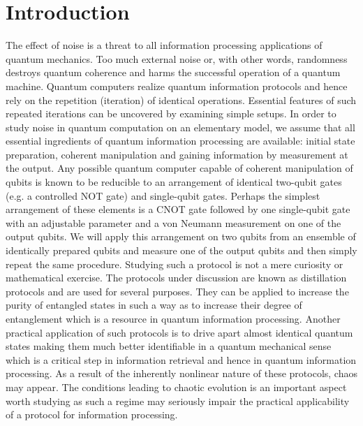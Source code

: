 \documentclass[%
 aip,
 amsmath,amssymb,
 reprint,%
]{revtex4-1}
\begin{document}
\section{\label{sec:level1}Introduction%
}

The effect of noise is a threat to all information processing applications of quantum mechanics. Too much external noise or, with other words, randomness destroys quantum coherence and harms the successful operation of a quantum machine. 
Quantum computers realize quantum information protocols and hence rely on the repetition (iteration) of identical operations. Essential features of such repeated iterations can be uncovered by examining simple setups.
In order to study noise in quantum computation on an elementary model, we assume that all essential ingredients of quantum information processing are available: initial state preparation, coherent manipulation and gaining information by measurement at the output.
 Any possible quantum computer capable of coherent manipulation of qubits is known to be reducible to an arrangement of identical two-qubit gates (e.g. a controlled NOT gate)  and single-qubit gates. Perhaps the simplest arrangement of these elements is a CNOT gate followed by one single-qubit gate with an adjustable parameter and a von Neumann measurement on one of the output qubits.  We will apply this arrangement on two qubits from an ensemble of identically prepared qubits and measure one of the output qubits \cite{Gisin} and then simply repeat the same procedure. Studying such a protocol is not a mere curiosity or mathematical exercise. The protocols under discussion are known as distillation protocols and are used for several purposes. They can be applied to increase the purity of entangled states in such a way as to increase their degree of entanglement which is a resource in quantum information processing. Another practical application of such protocols is to drive apart almost identical quantum states making them much better identifiable in a quantum mechanical sense which is a critical step in information retrieval and hence in quantum information processing. As a result of the inherently nonlinear nature of these protocols, chaos may appear. The conditions leading to chaotic evolution is an important aspect worth studying as such a regime may seriously impair the practical applicability of a protocol for information processing.
\end{document}
